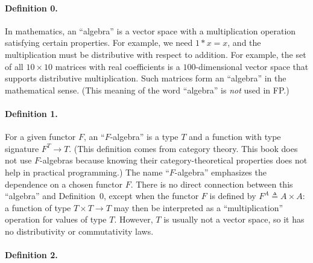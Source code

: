 \paragraph{Definition 0.}

In mathematics, an \textquotedblleft algebra\textquotedblright{} is
a vector space with a multiplication operation satisfying certain
properties. For example, we need $1*x=x$, and the multiplication
must be distributive with respect to addition. For example, the set
of all $10\times10$ matrices with real coefficients is a $100$-dimensional
vector space that supports distributive multiplication. Such matrices
form an \textquotedblleft algebra\textquotedblright{} in the mathematical
sense. (This meaning of the word \textsf{``}algebra\textsf{''} is \emph{not} used
in FP.)

\paragraph{Definition 1.}

For a given functor $F$, an \textsf{``}$F$-algebra\textsf{''}
is a type $T$ and a function with type signature $F^{T}\rightarrow T$.
(This definition comes from category theory. This book does not use
$F$-algebras because knowing their category-theoretical properties
does not help in practical programming.) The name \textsf{``}$F$-algebra\textsf{''}
emphasizes the dependence on a chosen functor $F$. There is no direct
connection between this \textsf{``}algebra\textsf{''} and Definition~0, except when
the functor $F$ is defined by $F^{A}\triangleq A\times A$: a function
of type $T\times T\rightarrow T$ may then be interpreted as a \textsf{``}multiplication\textsf{''}
operation for values of type $T$. However, $T$ is usually not a
vector space, so it has no distributivity or commutativity laws. 

\paragraph{Definition 2.}

